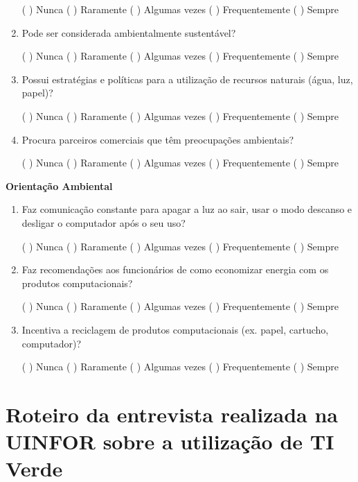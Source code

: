 \begin{apendicesenv}
\begin{enumerate}
    ( \space\space ) Nunca  ( \space\space ) Raramente  ( \space\space ) Algumas vezes  ( \space\space ) Frequentemente ( \space\space ) Sempre
    \item Pode ser considerada ambientalmente sustentável? 
    
    ( \space\space ) Nunca  ( \space\space ) Raramente  ( \space\space ) Algumas vezes  ( \space\space ) Frequentemente ( \space\space ) Sempre
    \item Possui estratégias e políticas para a utilização de recursos naturais (água, luz, papel)? 
    
    ( \space\space ) Nunca  ( \space\space ) Raramente  ( \space\space ) Algumas vezes  ( \space\space ) Frequentemente ( \space\space ) Sempre
    \item Procura parceiros comerciais que têm preocupações ambientais? 
    
    ( \space\space ) Nunca  ( \space\space ) Raramente  ( \space\space ) Algumas vezes  ( \space\space ) Frequentemente ( \space\space ) Sempre
\end{enumerate}
    
\textbf{Orientação Ambiental}

\begin{enumerate}
    \item Faz comunicação constante para apagar a luz ao sair, usar o modo descanso e desligar o computador após o seu uso? 
    
    ( \space\space ) Nunca  ( \space\space ) Raramente  ( \space\space ) Algumas vezes  ( \space\space ) Frequentemente ( \space\space ) Sempre
    \item Faz recomendações aos funcionários de como economizar energia com os produtos computacionais? 
    
    ( \space\space ) Nunca  ( \space\space ) Raramente  ( \space\space ) Algumas vezes  ( \space\space ) Frequentemente ( \space\space ) Sempre
    \item Incentiva a reciclagem de produtos computacionais (ex. papel, cartucho, computador)? 
    
    ( \space\space ) Nunca  ( \space\space ) Raramente  ( \space\space ) Algumas vezes  ( \space\space ) Frequentemente ( \space\space ) Sempre
\end{enumerate}

\chapter{Roteiro da entrevista realizada na UINFOR sobre a utilização de TI Verde}


\end{apendicesenv}
